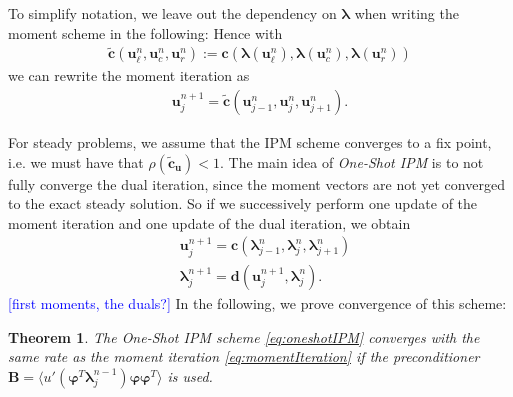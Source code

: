 \documentclass[10pt, a4paper, titlepage, bibliography=totocnumbered]{article}
\newtheorem{theorem}{Theorem}[section]
\begin{document}
To simplify notation, we leave out the dependency on $\bm{\lambda}$ when writing the moment scheme in the following: Hence with 
\begin{align*}
\bm{\tilde c}\left(\bm{u}_{\ell}^n,\bm{u}_{c}^n,\bm{u}_{r}^n\right):=\bm{c}\left(\bm{\lambda}(\bm{u}_{\ell}^n),\bm{\lambda}(\bm{u}_{c}^n),\bm{\lambda}(\bm{u}_{r}^n)\right)
\end{align*}
we can rewrite the moment iteration as
\begin{align}
\bm{u}_j^{n+1} = \bm{\tilde c}\left(\bm{u}_{j-1}^n,\bm{u}_{j}^n,\bm{u}_{j+1}^n\right).
\end{align}

For steady problems, we assume that the IPM scheme converges to a fix point, i.e. we must have that $\rho (\bm{\tilde c}_{\bm{u}})<1$. The main idea of \textit{One-Shot IPM} is to not fully converge the dual iteration, since the moment vectors are not yet converged to the exact steady solution. So if we successively perform one update of the moment iteration and one update of the dual iteration, we obtain 
\begin{subequations}\label{eq:oneshotIPM}
\begin{align}
&\bm{u}_j^{n+1} =  \bm{c}\left(\bm{\lambda}_{j-1}^n,\bm{\lambda}_{j}^n,\bm{\lambda}_{j+1}^n\right)\label{eq:oneshotIPMmoment}\\
&\bm{\lambda}_{j}^{n+1} =  \bm{d}(\bm{u}_j^{n+1},\bm{\lambda}_j^{n}). \label{eq:oneshotIPMdual}
\end{align}
\end{subequations}
\textcolor{blue}{[first moments, the duals?]}
In the following, we prove convergence of this scheme:
\begin{theorem}
The \textit{One-Shot IPM} scheme \eqref{eq:oneshotIPM} converges with the same rate as the moment iteration \eqref{eq:momentIteration} if the preconditioner $\bm{B} = \langle u'(\bm{\varphi}^T\bm{\lambda}_j^{n-1})\bm{\varphi}\bm{\varphi}^T\rangle$ is used.
\end{theorem}
\end{document}
